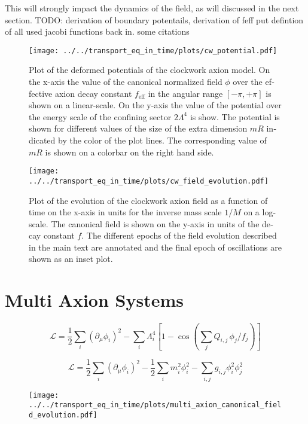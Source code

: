 \documentclass[master,       %
               twoside,        %
               BCOR10mm,       %
               english,ngerman, %
               ]{GAUBM}
\begin{document}
\begin{otherlanguage}{english}
This will strongly impact the dynamics of the field, as will discussed in the next section.
TODO: derivation of boundary potentails, derivation of feff
put defintion of all used jacobi functions back in.
some citations 
\begin{figure}[H]
	\label{fig:clockwork_pot_plot}
    \texttt{[image: ../../transport\_eq\_in\_time/plots/cw\_potential.pdf]}
    \caption{Plot of the deformed potentials of the clockwork axion model. On the x-axis the value of the canonical normalized field $\phi$ over the effective axion decay constant $f_\mathrm{eff}$ in the angular range $[-\pi, +\pi]$ is shown on a linear-scale. On the y-axis the value of the potential over the energy scale of the confining sector $2 \Lambda^4$ is show. The potential is shown for different values of the size of the extra dimension $mR$ indicated by the color of the plot lines. The corresponding value of $mR$ is shown on a colorbar on the right hand side.}
\end{figure}

\begin{figure}[h]
    \texttt{[image: ../../transport\_eq\_in\_time/plots/cw\_field\_evolution.pdf]}
    \caption{Plot of the evolution of the clockwork axion field as a function of time on the x-axis in units for the inverse mass scale $1/M$ on a log-scale. The canonical field is shown on the y-axis in units of the decay constant $f$. The different epochs of the field evolution described in the main text are annotated and the final epoch of oscillations are shown as an inset plot.}
\end{figure}


\section{Multi Axion Systems}

\begin{equation}
	\mathcal{L} = \frac{1}{2} \sum_i \left( \partial_\mu \phi_i \right)^2 - \sum_i \Lambda_i^4 \left[ 1 - \cos \left( \sum_j Q_{i,j} \, \phi_j / f_j \right) \right]
\end{equation}

\begin{equation}
	\mathcal{L} = \frac{1}{2} \sum_i \left( \partial_\mu \phi_i \right)^2 - \frac{1}{2} \sum_i m_i^2 \phi_i^2 - \sum_{i, j}
	g_{i, j} \phi_i^2 \phi_j^2
\end{equation}

\begin{figure}[h]
    \texttt{[image: ../../transport\_eq\_in\_time/plots/multi\_axion\_canonical\_field\_evolution.pdf]}
    \caption{}
\end{figure}


\end{otherlanguage}
\end{document}
